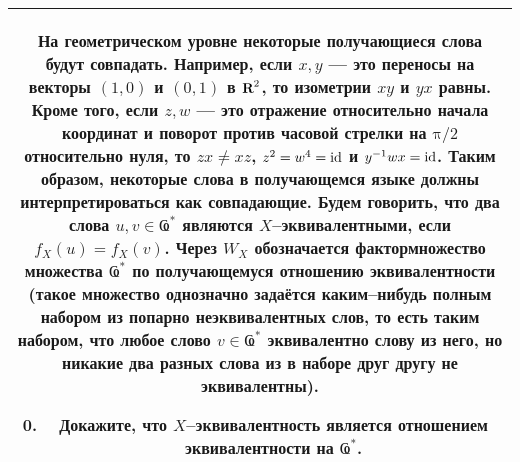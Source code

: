 \begin{center}
\begin{tabular}{|c|}
\hline
	\begin{minipage}{0.85\textwidth}
\medskip
На геометрическом уровне некоторые получающиеся слова будут совпадать. Например, если $x,y$ --- это переносы на векторы $(1,0)$ и $(0,1)$ в $\text{\bfseries R}^2$, то изометрии $xy$ и $yx$ равны. Кроме того, если $z,w$ --- это отражение относительно начала координат и поворот против часовой стрелки на $\text{π}/2$ относительно нуля, то $zx \neq xz$, $z^2 = w^4 = {\rm id}$ и $y^{-1}wx = {\rm id}$. Таким образом, некоторые слова в получающемся языке должны интерпретироваться как совпадающие. Будем говорить, что два слова $u,v \in \text{Ҩ}^*$ являются $X$--эквивалентными, если $f_X(u)=f_X(v)$. Через $W_X$ обозначается фактормножество множества $\text{Ҩ}^*$ по получающемуся отношению эквивалентности (такое множество однозначно задаётся каким--нибудь полным набором из попарно неэквивалентных слов, то есть таким набором, что любое слово $v \in \text{Ҩ}^*$ эквивалентно слову из него, но никакие два разных слова из в наборе друг другу не эквивалентны).
\begin{enumerate} \setcounter{enumi}{-1}
\item Докажите, что $X$--эквивалентность является отношением эквивалентности на $\text{Ҩ}^*$.
\end{enumerate} \smallskip
	\end{minipage} \\
\hline
\end{tabular}
\end{center}

\ \\

